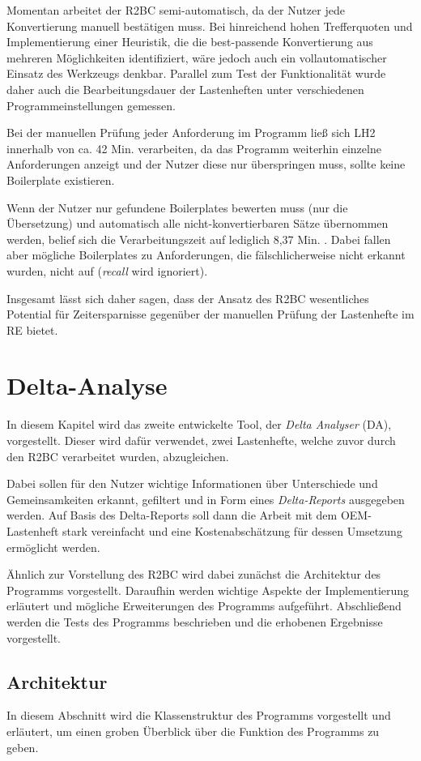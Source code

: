 \documentclass[12pt]{report}
\begin{document}
Momentan arbeitet der R2BC semi-automatisch, da der Nutzer jede Konvertierung manuell bestätigen muss. Bei hinreichend hohen Trefferquoten und Implementierung einer Heuristik, die die best-passende Konvertierung aus mehreren Möglichkeiten identifiziert, wäre jedoch auch ein vollautomatischer Einsatz des Werkzeugs denkbar. Parallel zum Test der Funktionalität wurde daher auch die Bearbeitungsdauer der Lastenheften unter verschiedenen Programmeinstellungen gemessen. 

Bei der manuellen Prüfung jeder Anforderung im Programm ließ sich LH2 innerhalb von ca. 42 Min. verarbeiten, da das Programm weiterhin einzelne Anforderungen anzeigt und der Nutzer diese nur überspringen muss, sollte keine Boilerplate existieren. 

Wenn der Nutzer nur gefundene Boilerplates bewerten muss (nur die Übersetzung) und automatisch alle nicht-konvertierbaren Sätze übernommen werden, belief sich die Verarbeitungszeit auf lediglich 8,37 Min. . Dabei fallen aber mögliche Boilerplates zu Anforderungen, die fälschlicherweise nicht erkannt wurden, nicht auf (\textit{recall} wird ignoriert).

Insgesamt lässt sich daher sagen, dass der Ansatz des R2BC wesentliches Potential für Zeitersparnisse gegenüber der manuellen Prüfung der Lastenhefte im RE bietet.

\chapter{Delta-Analyse}
In diesem Kapitel wird das zweite entwickelte Tool, der \textit{Delta Analyser} (DA), vorgestellt. Dieser wird dafür verwendet, zwei Lastenhefte, welche zuvor durch den R2BC verarbeitet wurden, abzugleichen. 

Dabei sollen für den Nutzer wichtige Informationen über Unterschiede und Gemeinsamkeiten erkannt, gefiltert und in Form eines \textit{Delta-Reports} ausgegeben werden. Auf Basis des Delta-Reports soll dann die Arbeit mit dem OEM-Lastenheft stark vereinfacht und eine Kostenabschätzung für dessen Umsetzung ermöglicht werden. 

Ähnlich zur Vorstellung des R2BC wird dabei zunächst die Architektur des Programms vorgestellt. Daraufhin werden wichtige Aspekte der Implementierung erläutert und mögliche Erweiterungen des Programms aufgeführt. Abschließend werden die Tests des Programms beschrieben und die erhobenen Ergebnisse vorgestellt.
 
\section{Architektur}
In diesem Abschnitt wird die Klassenstruktur des Programms vorgestellt und erläutert, um einen groben Überblick über die Funktion des Programms zu geben. 
\end{document}
